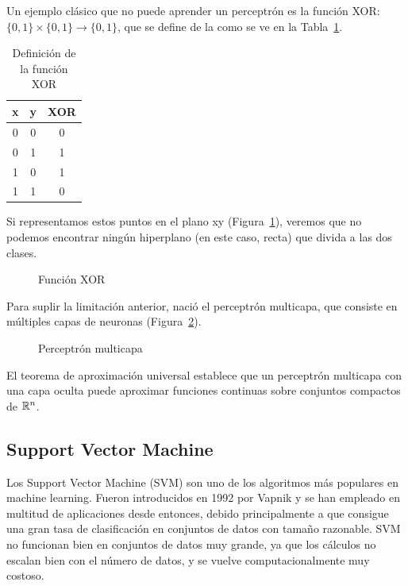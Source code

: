 Un ejemplo clásico que no puede aprender un perceptrón es la función XOR: $\{0,1\} \times \{0,1\} \to \{0,1\}$, que se define de la como se ve en la Tabla~\ref{tbl:xor}.\\


\begin{table}[htbp!]
	\centering
	\caption{Definición de la función XOR}
	\label{tbl:xor}
	\begin{tabular}{@{}ccc@{}}
		\toprule
		x & y & XOR \\ \midrule
		0 & 0 & 0   \\
		0 & 1 & 1   \\
		1 & 0 & 1   \\
		1 & 1 & 0   \\ \bottomrule
	\end{tabular}
\end{table}

Si representamos estos puntos en el plano xy (Figura~\ref{fig:xor}), veremos que no podemos encontrar ningún hiperplano (en este caso, recta) que divida a las dos clases.\\

\begin{figure}[htbp!]
	\label{fig:xor}
	\begin{center}
		\xor
	\end{center}
	\caption{Función XOR}
\end{figure}

Para suplir la limitación anterior, nació el perceptrón multicapa, que consiste en múltiples capas de neuronas (Figura~\ref{fig:perceptron_multicapa}).

\begin{figure}[htbp!]
	\label{fig:perceptron_multicapa}
	\begin{center}
		\perceptronmulticapa
	\end{center}
	\caption{Perceptrón multicapa}
\end{figure}

El teorema de aproximación universal establece que un perceptrón multicapa con una capa oculta puede aproximar funciones continuas sobre conjuntos compactos de $\mathbb{R}^n$.

\subsection{Support Vector Machine}
Los Support Vector Machine (SVM) son uno de los algoritmos más populares en machine learning. Fueron introducidos en 1992 por Vapnik y se han empleado en multitud de aplicaciones desde entonces, debido principalmente a que consigue una gran tasa de clasificación en conjuntos de datos con tamaño razonable. SVM no funcionan bien en conjuntos de datos muy grande, ya que los cálculos no escalan bien con el número de datos, y se vuelve computacionalmente muy costoso.\\

